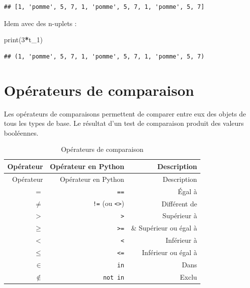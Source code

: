 \documentclass[
  12pt,
]{book}
\newenvironment{Shaded}{\begin{snugshade}}{\end{snugshade}}
\newcommand{\BuiltInTok}[1]{#1}
\newcommand{\DecValTok}[1]{\textcolor[rgb]{0.00,0.00,0.81}{#1}}
\newcommand{\NormalTok}[1]{#1}
\newcommand{\OperatorTok}[1]{\textcolor[rgb]{0.81,0.36,0.00}{\textbf{#1}}}
\numberwithin{equation}{section}
\numberwithin{countremarque}{section}
\begin{document}
\begin{lstlisting}
## [1, 'pomme', 5, 7, 1, 'pomme', 5, 7, 1, 'pomme', 5, 7]
\end{lstlisting}

Idem avec des n-uplets :

\begin{Shaded}
\begin{Highlighting}[]
\BuiltInTok{print}\NormalTok{(}\DecValTok{3}\OperatorTok{*}\NormalTok{t\_1)}
\end{Highlighting}
\end{Shaded}

\begin{lstlisting}
## (1, 'pomme', 5, 7, 1, 'pomme', 5, 7, 1, 'pomme', 5, 7)
\end{lstlisting}

\section{Opérateurs de comparaison}\label{operateurs-comparaison}

Les opérateurs de comparaisons permettent de comparer entre eux des objets de tous les types de base. Le résultat d'un test de comparaison produit des valeurs booléennes.

\begin{longtable}[]{@{}rrr@{}}
\caption{\label{tab:operateurs-comparaison} Opérateurs de comparaison}\tabularnewline
\toprule\noalign{}
Opérateur & Opérateur en Python & Description \\
\midrule\noalign{}
\endfirsthead
\toprule\noalign{}
Opérateur & Opérateur en Python & Description \\
\midrule\noalign{}
\endhead
\bottomrule\noalign{}
\endlastfoot
\(=\) & \texttt{==} & Égal à \\
\(\ne\) & \texttt{!=} (ou \texttt{\textless{}\textgreater{}}) & Différent de \\
\(>\) & \texttt{\textgreater{}} & Supérieur à \\
\(\geq\) & \texttt{\textgreater{}=} & \& Supérieur ou égal à \\
\(<\) & \texttt{\textless{}} & Inférieur à \\
\(\leq\) & \texttt{\textless{}=} & Inférieur ou égal à \\
\(\in\) & \texttt{in} & Dans \\
\(\notin\) & \texttt{not\ in} & Exclu \\
\end{longtable}
\end{document}
